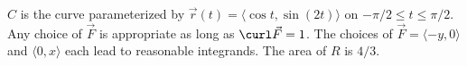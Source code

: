 {$C$ is the curve parameterized by $\vec r(t) = \langle \cos t,\sin (2t)\rangle$ on $-\pi/2\leq t\leq \pi/2$. 
}
{Any choice of $\vec F$ is appropriate as long as $\curl \vec F = 1$. The choices of  $\vec F = \langle -y,0\rangle$ and $\langle 0,x\rangle$ each lead to reasonable integrands. The area of $R$ is $4/3$.
}
